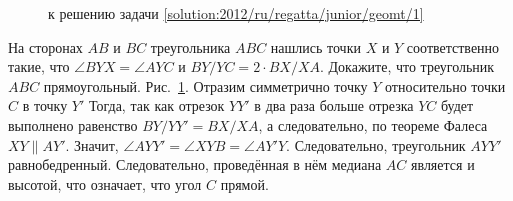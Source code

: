 \ifsolution
\begin{figure}\centering
    \caption{к решению задачи \ref{solution:2012/ru/regatta/junior/geomt/1}}
    \label{fig:solution:2012/ru/regatta/junior/geomt/1}
\end{figure}
\fi %

\problem
На сторонах $AB$ и $BC$ треугольника $ABC$ нашлись точки $X$ и $Y$
соответственно такие, что
$\angle BYX = \angle AYC$ и $BY / YC = 2 \cdot BX / XA$.
Докажите, что треугольник $ABC$ прямоугольный.
\solution
\label{solution:2012/ru/regatta/junior/geomt/1}%
Рис.~\ref{fig:solution:2012/ru/regatta/junior/geomt/1}.
Отразим симметрично точку $Y$ относительно точки $C$ в точку $Y'$
Тогда, так как отрезок $YY'$ в два раза больше отрезка $YC$ будет выполнено
равенство $BY / YY' = BX / XA$, а следовательно, по теореме
Фалеса $XY \parallel AY'$.
Значит, $\angle AYY' = \angle XYB = \angle AY'Y$.
Следовательно, треугольник $AYY'$ равнобедренный.
Следовательно, проведённая в нём медиана $AC$ является и высотой,
что означает, что угол $C$ прямой.
\endproblem
